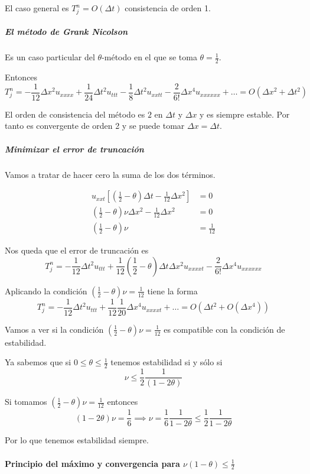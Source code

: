 El caso general es $T_j^n = O(\Delta t)$ consistencia de orden 1.

\subparagraph{El método de Grank Nicolson}\mbox{}

Es un caso particular del  $\theta$-método en el que se toma $\theta = \frac{1}{2}$.

Entonces
$$T_j^n = -\frac{1}{12}\Delta x^2 u_{xxxx} + \frac{1}{24}\Delta t^2u_{ttt}-\frac{1}{8}\Delta t ^2u_{xxtt} - \frac{2}{6!}\Delta x ^4 u_{xxxxxx} + \hdots = O(\Delta x^2 + \Delta t ^2)$$

El orden de consistencia del método es $2$ en $\Delta t$ y $\Delta x$ y es siempre estable. Por tanto es convergente de orden 2 y se puede tomar $\Delta x = \Delta t$.

\subparagraph{Minimizar el error de truncación}\mbox{}

Vamos a tratar de hacer cero la suma de los dos términos.

\begin{align*}
u_{xxt}\left[\left(\frac{1}{2}-\theta\right)\Delta t - \frac{1}{12}\Delta x^2\right] & = 0\\
\left(\frac{1}{2}-\theta\right)\nu\Delta x^2 - \frac{1}{12}\Delta x^2  & = 0\\
\left(\frac{1}{2}-\theta\right)\nu & = \frac{1}{12}
\end{align*}

Nos queda que el error de truncación es
$$T_j^n = -\frac{1}{12}\Delta t^2 u_{ttt} + \frac{1}{12}\left(\frac{1}{2}-\theta\right)\Delta t \Delta x^2u_{xxxxt}
-\frac{2}{6!}\Delta x^4 u_{xxxxxx}$$

Aplicando la condición $\left(\frac{1}{2}-\theta\right)\nu = \frac{1}{12}$ tiene la forma
$$T_j^n = -\frac{1}{12}\Delta t^2  u_{ttt} +\frac{1}{12}\frac{1}{20}\Delta x^4u_{xxxxt} +\hdots
= O(\Delta t^2 + O(\Delta x ^4))$$

Vamos a ver si la condición $\left(\frac{1}{2}-\theta\right)\nu = \frac{1}{12}$ es compatible con la condición de estabilidad.

Ya sabemos que si $0\le\theta\le\frac{1}{2}$ tenemos estabilidad si y sólo si $$\nu\le\frac{1}{2}\frac{1}{(1-2\theta)}$$

Si tomamos $(\frac{1}{2}-\theta)\nu = \frac{1}{12}$ entonces
$$ (1-2\theta)\nu=\frac{1}{6}\implies \nu=\frac{1}{6}\frac{1}{1-2\theta}\le\frac{1}{2}\frac{1}{1-2\theta}$$

Por lo que tenemos estabilidad siempre.

\paragraph{Principio del máximo y convergencia para $\nu(1-\theta) \le \frac{1}{2}$}\mbox{}

